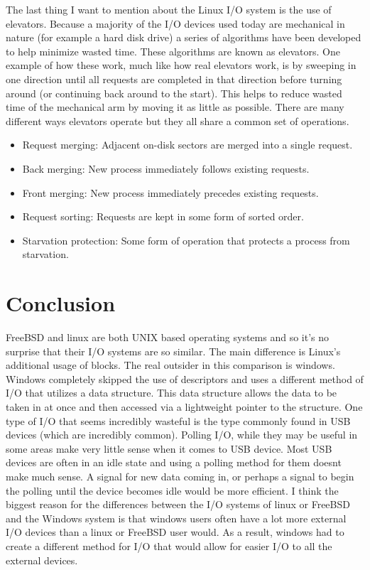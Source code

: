 \documentclass[letterpaper, 10pt, draftclsnofoot,onecolumn]{article}
\begin{document}
\newline
The last thing I want to mention about the Linux I/O system is the use of elevators. Because a majority of the I/O devices used today are mechanical in nature (for example a hard disk drive) a series of algorithms have been developed to help minimize wasted time. These algorithms are known as elevators. One example of how these work, much like how real elevators work, is by sweeping in one direction until all requests are completed in that direction before turning around (or continuing back around to the start). This helps to reduce wasted time of the mechanical arm by moving it as little as possible.
\newline 
There are many different ways elevators operate but they all share a common set of operations. 
\begin{itemize}
\item Request merging: Adjacent on-disk sectors are merged into a single request.
\item Back merging: New process immediately follows existing requests.
\item Front merging: New process immediately precedes existing requests.
\item Request sorting: Requests are kept in some form of sorted order.
\item Starvation protection: Some form of operation that protects a process from starvation.
\end{itemize}

\section{Conclusion}
FreeBSD and linux are both UNIX based operating systems and so it's no surprise that their I/O systems are so similar. The main difference is Linux's additional usage of blocks. The real outsider in this comparison is windows. Windows completely skipped the use of descriptors and uses a different method of I/O that utilizes a data structure. This data structure allows the data to be taken in at once and then accessed via a lightweight pointer to the structure.
\newline
\newline
One type of I/O that seems incredibly wasteful is the type commonly found in USB devices (which are incredibly common). Polling I/O, while they may be useful in some areas make very little sense when it comes to USB device. Most USB devices are often in an idle state and using a polling method for them doesnt make much sense. A signal for new data coming in, or perhaps a signal to begin the polling until the device becomes idle would be more efficient.
\newline
I think the biggest reason for the differences between the I/O systems of linux or FreeBSD and the Windows system is that windows users often have a lot more external I/O devices than a linux or FreeBSD user would. As a result, windows had to create a different method for I/O that would allow for easier I/O to all the external devices. 
\end{document}
